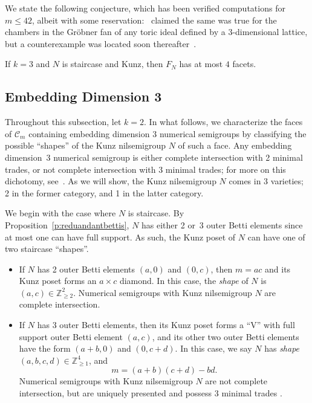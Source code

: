 \documentclass[ALCO, Unicode]{cedram}
\newcommand\ZZ{\mathbb{Z}}
\newcommand\cC{{\mathcal C}}
\begin{document}
We state the following conjecture, which has been verified computations for $m \le 42$, albeit with some reservation:\ \cite[Conjecture~6.2]{groenberfanchamberfacets} claimed the same was true for the chambers in the Gr\"obner fan of any toric ideal defined by a 3-dimensional lattice, but a counterexample was located soon thereafter~\cite{vertexideal}.  

\begin{conj}\label{conj:4facets}
If $k = 3$ and $N$ is staircase and Kunz, then $F_N$ has at most $4$ facets.
\end{conj}


\subsection{Embedding Dimension 3}
\label{subsec:embed3}

Throughout this subsection, let $k = 2$.  
In what follows, we characterize the faces of $\cC_m$ containing embedding dimension $3$ numerical semigroups by classifying the possible ``shapes'' of the Kunz nilsemigroup $N$ of such a face.  
Any embedding dimension~3 numerical semigroup is either complete intersection with 2 minimal trades, or not complete intersection with 3 minimal trades; for more on this dichotomy, see~\cite[Chapter~10]{numerical}.  As we will show, the Kunz nilsemigroup $N$ comes in 3 varieties; 2 in the former category, and 1 in the latter category.  

We begin with the case where $N$ is staircase.  By Proposition~\ref{p:reduandantbettis}, $N$ has either 2 or~3 outer Betti elements since at most one can have full support.  
As such, the Kunz poset of $N$ can have one of two staircase ``shapes''.  
\begin{itemize}
\item 
If $N$ has 2 outer Betti elements $(a,0)$ and $(0,c)$, then $m = ac$ and its Kunz poset forms an $a \times c$ diamond.  In this case, the \emph{shape} of $N$ is $(a,c) \in \ZZ_{\ge 2}^2$.  Numerical semigroups with Kunz nilsemigroup $N$ are complete intersection.  

\item 
If $N$ has 3 outer Betti elements, then its Kunz poset forms a ``V'' with full support outer Betti element $(a,c)$, and its other two outer Betti elements have the form $(a + b, 0)$ and $(0, c + d)$.  In this case, we say $N$ has \emph{shape} $(a, b, c, d) \in \ZZ_{\ge 1}^4$, and 
\[
m = (a+b)(c+d) - bd.
\]
Numerical semigroups with Kunz nilsemigroup $N$ are not complete intersection, but are uniquely presented and possess 3 minimal trades \cite[Chapter~10]{numerical}.  
\end{itemize}
\end{document}
